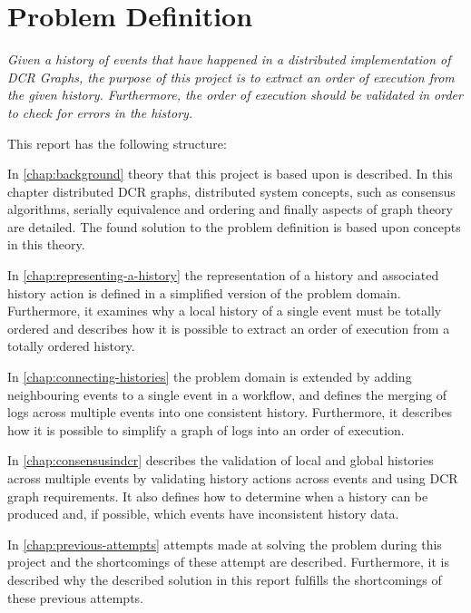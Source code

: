 \section{Problem Definition} %
	\textit{Given a history of events that have happened in a distributed implementation of DCR Graphs, the purpose of this project is to extract an order of execution from the given history. Furthermore, the order of execution should be validated in order to check for errors  in the history.}
	
	\vspace{0.6cm}
	
	\newpar
	This report has the following structure:
	
	\newpar
	In \autoref{chap:background} theory that this project is based upon is described. In this chapter distributed DCR graphs, distributed system concepts, such as consensus algorithms, serially equivalence and ordering and finally aspects of graph theory are detailed.
	The found solution to the problem definition is based upon concepts in this theory.
		
	\newpar
	In \autoref{chap:representing-a-history} the representation of a history and associated history action is defined in a simplified version of the problem domain. 
	Furthermore, it examines why a local history of a single event must be totally ordered and describes how it is possible to extract an order of execution from a totally ordered history.
		
	\newpar
	In \autoref{chap:connecting-histories} the problem domain is extended by adding neighbouring events to a single event in a workflow, and defines the merging of logs across multiple events into one consistent history. Furthermore, it describes how it is possible to simplify a graph of logs into an order of execution.
	
	\newpar
	In \autoref{chap:consensusindcr} describes the validation of local and global histories across multiple events by validating history actions across events and using DCR graph requirements. It also defines how to determine when a history can be produced and, if possible, which events have inconsistent history data.
	
	\newpar
	In \autoref{chap:previous-attempts} attempts made at solving the problem during this project and the shortcomings of these attempt are described. Furthermore, it is described why the described solution in this report fulfills the shortcomings of these previous attempts. 
		
	